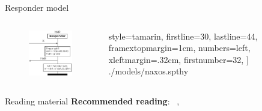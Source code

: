 \documentclass[11pt,aspectratio=169]{beamer}
\begin{document}
\begin{frame}[fragile]{Responder model}
    \begin{columns}
        \begin{column}{0.45\textwidth}
            \begin{figure}
                \includegraphics[width=.7\textwidth]
                    {./figures/lecture_6/naxos_resp}%
            \end{figure}
        \end{column}
        \begin{column}{0.55\textwidth}
            
                style=tamarin,
                firstline=30,
                lastline=44,
                framextopmargin=1cm,
                numbers=left,
                xleftmargin=.32cm,
                firstnumber=32,
            ] {./models/naxos.spthy}
        \end{column}
    \end{columns}
\end{frame}

\begin{frame}[fragile]{Reading material}
    \textbf{Recommended reading}:
        ~\cite[Ch. 11]{tamarin-book},
    \begin{refsection}
        \nocite{tamarin-book}
        \printbibliography[heading=none]
    \end{refsection}
\end{frame}
\end{document}
